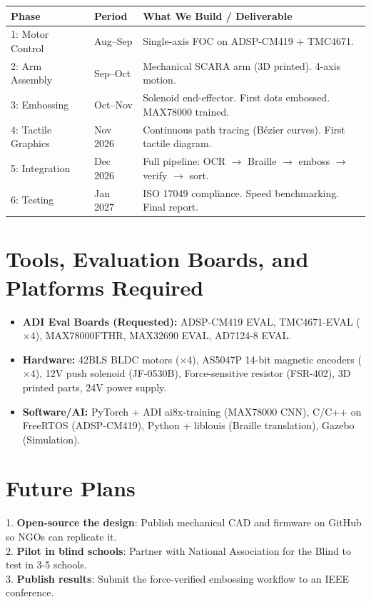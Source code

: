 \documentclass[11pt,a4paper]{article}
\begin{document}
\begin{table}[H]
\centering
\begin{tabularx}{\textwidth}{llX}
\toprule
\textbf{Phase} & \textbf{Period} & \textbf{What We Build / Deliverable} \\
\midrule
1: Motor Control & Aug--Sep & Single-axis FOC on ADSP-CM419 + TMC4671. \\
2: Arm Assembly & Sep--Oct & Mechanical SCARA arm (3D printed). 4-axis motion. \\
3: Embossing & Oct--Nov & Solenoid end-effector. First dots embossed. MAX78000 trained. \\
4: Tactile Graphics & Nov 2026 & Continuous path tracing (Bézier curves). First tactile diagram. \\
5: Integration & Dec 2026 & Full pipeline: OCR $\rightarrow$ Braille $\rightarrow$ emboss $\rightarrow$ verify $\rightarrow$ sort. \\
6: Testing & Jan 2027 & ISO 17049 compliance. Speed benchmarking. Final report. \\
\bottomrule
\end{tabularx}
\end{table}

\section{Tools, Evaluation Boards, and Platforms Required}

\begin{itemize}[noitemsep]
    \item \textbf{ADI Eval Boards (Requested):} ADSP-CM419 EVAL, TMC4671-EVAL ($\times$4), MAX78000FTHR, MAX32690 EVAL, AD7124-8 EVAL.
    \item \textbf{Hardware:} 42BLS BLDC motors ($\times$4), AS5047P 14-bit magnetic encoders ($\times$4), 12V push solenoid (JF-0530B), Force-sensitive resistor (FSR-402), 3D printed parts, 24V power supply.
    \item \textbf{Software/AI:} PyTorch + ADI ai8x-training (MAX78000 CNN), C/C++ on FreeRTOS (ADSP-CM419), Python + liblouis (Braille translation), Gazebo (Simulation).
\end{itemize}

\section{Future Plans}
1. \textbf{Open-source the design}: Publish mechanical CAD and firmware on GitHub so NGOs can replicate it.\\
2. \textbf{Pilot in blind schools}: Partner with National Association for the Blind to test in 3-5 schools.\\
3. \textbf{Publish results}: Submit the force-verified embossing workflow to an IEEE conference.
\end{document}
